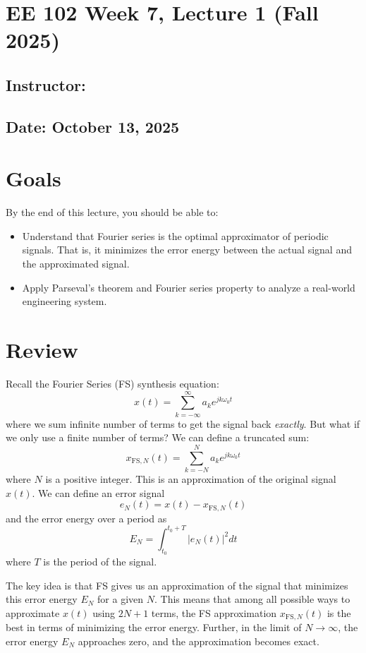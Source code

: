 \documentclass{ee102_notes}
\renewcommand{\releasedate}{October 13, 2025}
\begin{document}
\section*{EE 102 Week 7, Lecture 1 (Fall 2025)}
\subsection*{Instructor: \instructor}
\subsection*{Date: \releasedate}

\section{Goals}
By the end of this lecture, you should be able to:
\begin{itemize}
\item Understand that Fourier series is the optimal approximator of periodic signals. That is, it minimizes the error energy between the actual signal and the approximated signal.
\item Apply Parseval's theorem and Fourier series property to analyze a real-world engineering system. 
\end{itemize}

\section{Review}
Recall the Fourier Series (FS) synthesis equation:
\[
x(t) = \sum_{k=-\infty}^{\infty} a_k e^{j k \omega_0 t}
\]
where we sum infinite number of terms to get the signal back \emph{exactly}. But what if we only use a finite number of terms? We can define a truncated sum:
\[
x_{\text{FS},N}(t) = \sum_{k=-N}^{N} a_k e^{j k \omega_0 t}
\]
where \(N\) is a positive integer. This is an approximation of the original signal \(x(t)\). We can define an error signal
\[
e_N(t) = x(t) - x_{\text{FS},N}(t)
\]
and the error energy over a period as
\[
E_N = \int_{t_0}^{t_0+T} |e_N(t)|^2 dt
\]
where \(T\) is the period of the signal.

The key idea is that FS gives us an approximation of the signal that minimizes this error energy \(E_N\) for a given \(N\). This means that among all possible ways to approximate \(x(t)\) using \(2N+1\) terms, the FS approximation \(x_{\text{FS},N}(t)\) is the best in terms of minimizing the error energy. Further, in the limit of \(N \to \infty\), the error energy \(E_N\) approaches zero, and the approximation becomes exact.
\end{document}
